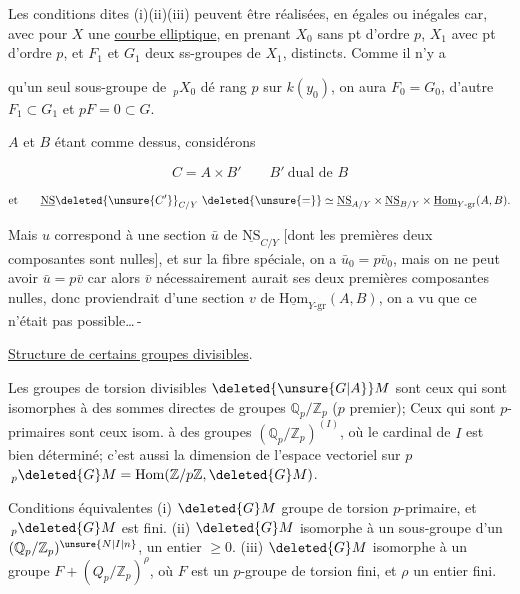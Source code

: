 Les conditions dites (i)(ii)(iii) peuvent être réalisées, en égales ou inégales car, avec pour $X$ une \uline{courbe elliptique}, en prenant $X_0$ sans pt d'ordre $p$, $X_1$ avec pt d'ordre $p$, et $F_1$ et $G_1$ deux ss-groupes de $X_1$,  distincts. Comme il n'y a


qu'un seul sous-groupe de $\,{}_pX_0$ dé rang $p$ sur $k(y_0)$, on aura $F_0=G_0$, d'autre  $F_1\subset G_1$ et $pF=0\subset G$.

$A$ et $B$ étant comme dessus, considérons

\[
C=A\times B'\qquad B'\ \text{dual de } B
\]

\[
\text{et}\qquad
\underline{\mathrm{NS}}\deleted{\unsure{C'}}_{C/Y}\ \deleted{\unsure{=}}\simeq\underline{\mathrm{NS}}_{A/Y}\times\underline{\mathrm{NS}}_{B/Y}\times\underline{\mathrm{Hom}}_{Y\text{-gr}}(A,B).
\]

Mais $u$ correspond à une section $\bar{u}$ de $\underline{\mathrm{NS}}_{C/Y}$ [dont les premières deux composantes sont nulles], et sur la fibre  spéciale, on a $\bar{u}_0=p\bar{v}_0$, mais on ne peut avoir $\bar{u}=p\bar{v}$ car alors $\bar{v}$ nécessairement aurait ses deux premières composantes nulles, donc proviendrait d'une section $v$ de $\underline{\mathrm{Hom}}_{Y\text{-gr}}(A,B)$, on a vu que ce n'était pas possible\ldots\,-


\uline{Structure de certains groupes divisibles}.

 Les groupes de torsion divisibles $\deleted{\unsure{G|A}}M$ sont ceux qui sont isomorphes à des sommes directes de groupes $\mathbb{Q}_p/\mathbb{Z}_p$ ($p$ premier); Ceux qui sont $p$-primaires sont ceux isom. à des  groupes $(\mathbb{Q}_p/\mathbb{Z}_p)^{(I)}$, où le cardinal de $I$ est bien déterminé; c'est aussi la dimension de l'espace vectoriel sur $p$ $\,{}_p\deleted{G}M=\operatorname{Hom}(\mathbb{Z}/p\mathbb{Z},\deleted{G}M)$.


Conditions équivalentes (i) $\deleted{G}M$ groupe de torsion $p$-primaire, et $\,{}_p\deleted{G}M$ est fini. (ii) $\deleted{G}M$ isomorphe à un sous-groupe d'un $(\mathbb{Q}_p/\mathbb{Z}_p)^{\unsure{N|I|n}}$,  un entier $\geq0$. (iii) $\deleted{G}M$ isomorphe à un groupe $F+(Q_p/\mathbb{Z}_p)^\rho$, où $F$ est un $p$-groupe de torsion fini, et $\rho$ un entier fini.

